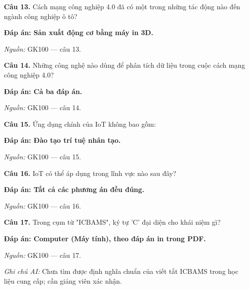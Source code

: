 \documentclass[11pt,a4paper]{article}
\begin{document}
\textbf{Câu 13.} Cách mạng công nghiệp 4.0 đã có một trong những tác động nào đến ngành công nghiệp ô tô?\par
{\color{answer}\textbf{Đáp án: Sản xuất động cơ bằng máy in 3D.}}\par
{\footnotesize\color{sourcegray}\textit{Nguồn:} GK100 — câu 13.\par}
\vspace{3pt}\par\noindent{\color{black!18}\rule{\linewidth}{0.3pt}}\par\medskip

\textbf{Câu 14.} Những công nghệ nào dùng để phân tích dữ liệu trong cuộc cách mạng công nghiệp 4.0?\par
{\color{answer}\textbf{Đáp án: Cả ba đáp án.}}\par
{\footnotesize\color{sourcegray}\textit{Nguồn:} GK100 — câu 14.\par}
\vspace{3pt}\par\noindent{\color{black!18}\rule{\linewidth}{0.3pt}}\par\medskip

\textbf{Câu 15.} Ứng dụng chính của IoT không bao gồm:\par
{\color{answer}\textbf{Đáp án: Đào tạo trí tuệ nhân tạo.}}\par
{\footnotesize\color{sourcegray}\textit{Nguồn:} GK100 — câu 15.\par}
\vspace{3pt}\par\noindent{\color{black!18}\rule{\linewidth}{0.3pt}}\par\medskip

\textbf{Câu 16.} IoT có thể áp dụng trong lĩnh vực nào sau đây?\par
{\color{answer}\textbf{Đáp án: Tất cả các phương án đều đúng.}}\par
{\footnotesize\color{sourcegray}\textit{Nguồn:} GK100 — câu 16.\par}
\vspace{3pt}\par\noindent{\color{black!18}\rule{\linewidth}{0.3pt}}\par\medskip

\textbf{Câu 17.} Trong cụm từ "ICBAMS", ký tự 'C' đại diện cho khái niệm gì?\par
{\color{answer}\textbf{Đáp án: Computer (Máy tính), theo đáp án in trong PDF.}}\par
{\footnotesize\color{sourcegray}\textit{Nguồn:} GK100 — câu 17.\par}
{\footnotesize\color{sourcegray}\textit{Ghi chú AI:} Chưa tìm được định nghĩa chuẩn của viết tắt ICBAMS trong học liệu cung cấp; cần giảng viên xác nhận.\par}
\vspace{3pt}\par\noindent{\color{black!18}\rule{\linewidth}{0.3pt}}\par\medskip
\end{document}
